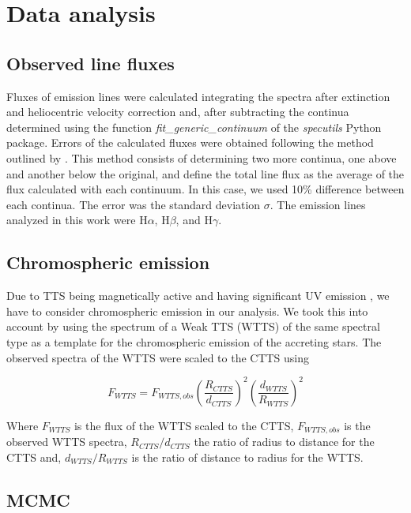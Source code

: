 \documentclass[twocolumn,linenumbers]{aastex631}
\newcommand{\halpha}{H$\alpha$}
\newcommand{\hbeta}{H$\beta$}
\newcommand{\hgamma}{H$\gamma$}
\begin{document}
\section{Data analysis}

\subsection{Observed line fluxes}

Fluxes of emission lines were calculated integrating the spectra after extinction and heliocentric velocity correction and, after subtracting the continua determined using the function \textit{fit_generic_continuum} of the \textit{specutils} Python package. Errors of the calculated fluxes were obtained following the method outlined by \citet{alcala2014}. This method consists of determining two more continua, one above and another below the original, and define the total line flux as the average of the flux calculated with each continuum. In this case, we used 10\% difference between each continua. The error was the standard deviation $\sigma$. The emission lines analyzed in this work were \halpha, \hbeta, and \hgamma.

\subsection{Chromospheric emission}

Due to TTS being magnetically active and having significant UV emission \citep{ingleby2013}, we have to consider chromospheric emission in our analysis. We took this into account by using the spectrum of a Weak TTS (WTTS) of the same spectral type as a template for the chromospheric emission of the accreting stars. The observed spectra of the WTTS were scaled to the CTTS using

\begin{equation}
    F_{WTTS} =  F_{WTTS,obs} \left(\frac{R_{CTTS}}{d_{CTTS}}\right)^2 \left(\frac{d_{WTTS}}{R_{WTTS}}\right)^2
\end{equation}

Where $F_{WTTS}$ is the flux of the WTTS scaled to the CTTS, $F_{WTTS,obs}$ is the observed WTTS spectra, $R_{CTTS}/d_{CTTS}$ the ratio of radius to distance for the CTTS and, $d_{WTTS}/R_{WTTS}$ is the ratio of distance to radius for the WTTS.

\subsection{MCMC}
\end{document}
